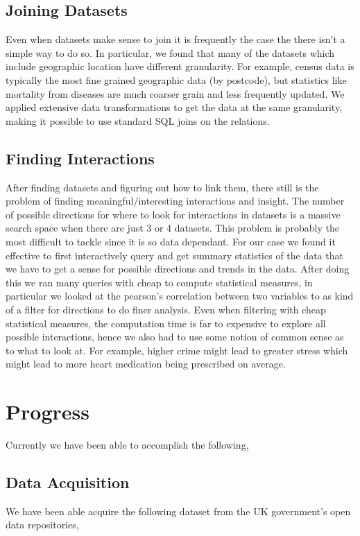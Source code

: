 \documentclass[a4paper]{article}
\begin{document}
	\subsection{Joining Datasets}
		Even when datasets make sense to join it is frequently the case the there isn't a simple way to do so. 
		In particular, we found that many of the datasets which include geographic location have different granularity.
		For example, census data is typically the most fine grained geographic data (by postcode), but statistics like mortality from
		diseases are much coarser grain and less frequently updated. We applied extensive data transformations to get the data at the 
		same granularity, making it possible to use standard SQL joins on the relations.

	
	\subsection{Finding Interactions}
		After finding datasets and figuring out how to link them, there still is the problem of finding 
		meaningful/interesting interactions and insight. The number of possible directions for where to look for
		interactions in datasets is a massive search space when there are just 3 or 4 datasets. This problem 
		is probably the most difficult to tackle since it is so data dependant.
		For our case we found it effective to first interactively query and get summary statistics of the data
		that we have to get a sense for possible directions and trends in the data. After doing this we ran many queries with cheap to 
		compute statistical measures, in particular we looked at the pearson's correlation between two variables to as kind of 
		a filter for directions to do finer analysis. Even when filtering with cheap statistical measures, the computation time
		is far to expensive to explore all possible interactions, hence we also had to use some notion of common sense as to 
		what to look at.  For example, higher crime might lead to greater stress which might lead 
		to more heart medication being prescribed on average.

\section{Progress}
	Currently we have been able to accomplish the following,

	\subsection{Data Acquisition}
		We have been able acquire the following dataset from the UK government's open data repositories, ~\cite{ref:UKDataSets} ~\cite{ref:UKStats}
\end{document}
